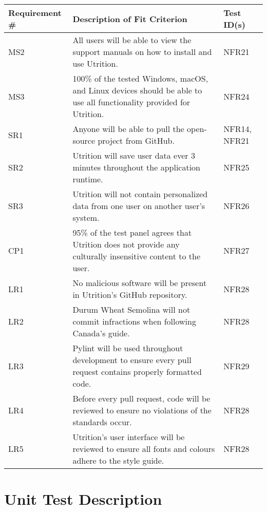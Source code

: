 \documentclass[12pt, titlepage]{article}
\begin{document}
	\begin{table}[H]
		\begin{tabularx}{\textwidth}{|l|X|l|}
			\hline
			{\bf Requirement \#} & {\bf Description of Fit Criterion} & {\bf Test ID(s)}\\
			\hline
			MS2 & All users will be able to view the support manuals on how to install and use Utrition. & NFR21\\
			\hline
			MS3 & 100\% of the tested Windows, macOS, and Linux devices should be able to use all functionality provided for Utrition. & NFR24\\
			\hline
			SR1 & Anyone will be able to pull the open-source project from GitHub. & NFR14, NFR21 \\
			\hline
			SR2 & Utrition will save user data ever 3 minutes throughout the 
			application runtime. & NFR25\\
			\hline
			SR3 & Utrition will not contain personalized data from one user on another user's system. & NFR26\\
			\hline
			CP1 & 95\% of the test panel agrees that Utrition does not provide any culturally insensitive content to the user. & NFR27\\
			\hline
			LR1 & No malicious software will be present in Utrition’s GitHub repository. & NFR28\\
			\hline
			LR2 & Durum Wheat Semolina will not commit infractions when following Canada’s guide. & NFR28\\
			\hline
			LR3 & Pylint will be used throughout development to ensure every pull request contains properly formatted code. & NFR29\\
			\hline
			LR4 & Before every pull request, code will be reviewed to ensure no violations of the standards occur.  & NFR28\\
			\hline
			LR5 & Utrition's user interface will be reviewed to ensure all fonts and colours adhere to the style guide.  & NFR28\\
			\hline
		\end{tabularx}
	\end{table}
	
	\section{Unit Test Description}
	
	
\end{document}
